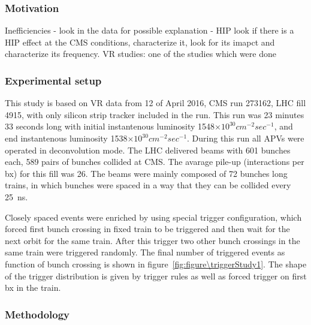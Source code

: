 \subsubsection{Motivation}

Inefficiencies - look in the data for possible explanation - HIP
look if there is a HIP effect at the CMS conditions, characterize it, look for its imapct and characterize its frequency.
VR studies: one of the studies which were done

\subsubsection{Experimental setup} 

This study is based on VR data from 12 of April 2016, CMS run 273162, LHC fill 4915, with only silicon strip tracker included in the run. This run was 23 minutes 33 seconds long with initial instantenous luminosity 1548$\times 10^{30} cm^{-2} sec^{-1}$, and end instantenous luminosity 1538$\times 10^{30} cm^{-2} sec^{-1}$. During this run all APVs were operated in deconvolution mode. The LHC delivered beams with 601 bunches each, 589 pairs of bunches collided at CMS. The avarage pile-up (interactions per bx) for this fill was 26. The beams were mainly composed of 72 bunches long trains, in which bunches were spaced in a way that they can be collided every 25~ns.

Closely spaced events were enriched by using special trigger configuration, which forced first bunch crossing in fixed train to be triggered and then wait for the next orbit for the same train. After this trigger two other bunch crossings in the same train were triggered randomly. The final number of triggered events as function of bunch crossing is shown in figure~\ref{fig:figure\triggerStudy1}. The shape of the trigger distribution is given by trigger rules as well as forced trigger on first bx in the train.



 \subsubsection{Methodology}
 

